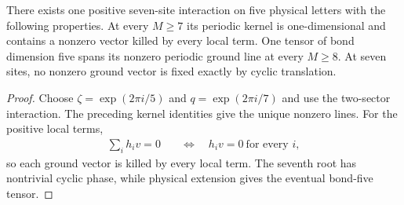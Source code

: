 \begin{lemma}
    \label{lem:seven_sector_concrete_interaction}
    \leanok
    There exists one positive seven-site interaction on five physical letters
    with the following properties. At every $M\ge7$ its periodic
    kernel is one-dimensional and contains a nonzero vector killed by every
    local term. One tensor of bond dimension five spans its nonzero
    periodic ground line at every $M\ge8$. At seven sites, no nonzero ground
    vector is fixed exactly by cyclic translation.
\end{lemma}
\begin{proof}
    \leanok
    Choose $\zeta=\exp(2\pi i/5)$ and $q=\exp(2\pi i/7)$ and use the
    two-sector interaction. The preceding kernel identities give the unique
    nonzero lines. For the positive local terms,
    \begin{align}
        \sum_ih_iv=0 & \quad\Longleftrightarrow\quad h_iv=0\ \text{for every }i,
    \end{align}
    so each ground vector is killed by every local term. The seventh root has nontrivial
    cyclic phase, while physical extension gives the eventual
    bond-five tensor.
\end{proof}
